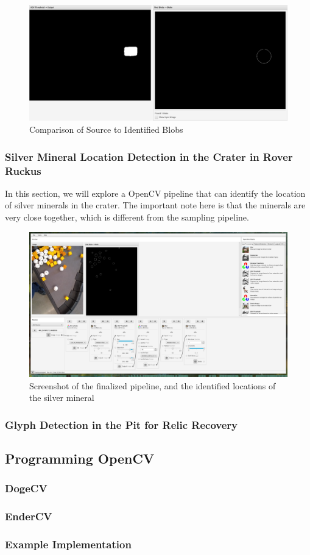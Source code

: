 \documentclass[../main.tex]{subfiles}
\begin{document}
\begin{figure}[H]
    \centering
    \includegraphics[width=400pt]{sections/vision/images/opencv/gold_pipeline_blob.png}
    \caption{Comparison of Source to Identified Blobs}
\end{figure}
\subsubsection{Silver Mineral Location Detection in the Crater in Rover Ruckus}
In this section, we will explore a OpenCV pipeline that can identify the location of silver minerals in the crater. The important note here is that the minerals are very close together, which is different from the sampling pipeline.
\begin{figure}[H]
    \centering
    \includegraphics[width=400pt]{sections/vision/images/opencv/crater_grip_screenshot.png}
    \caption{Screenshot of the finalized pipeline, and the identified locations of the silver mineral}
\end{figure}
\subsubsection{Glyph Detection in the Pit for Relic Recovery}
\subsection{Programming OpenCV}
\subsubsection{DogeCV}
\subsubsection{EnderCV}
\subsubsection{Example Implementation}
\end{document}
